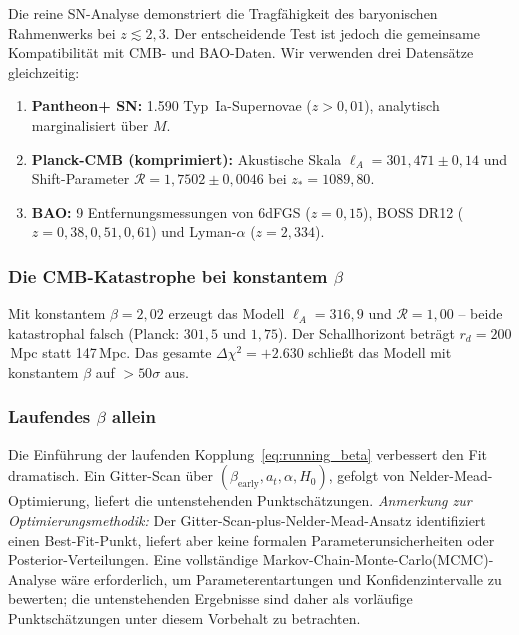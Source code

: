 \documentclass[aps,prd,twocolumn,superscriptaddress,nofootinbib,floatfix]{revtex4-2}
\begin{document}
Die reine SN-Analyse demonstriert die Tragfähigkeit des baryonischen Rahmenwerks bei $z \lesssim 2{,}3$. Der entscheidende Test ist jedoch die gemeinsame Kompatibilität mit CMB- und BAO-Daten. Wir verwenden drei Datensätze gleichzeitig:

\begin{enumerate}
\item \textbf{Pantheon+ SN:} 1.590 Typ~Ia-Supernovae ($z > 0{,}01$), analytisch marginalisiert über $M$.
\item \textbf{Planck-CMB (komprimiert):} Akustische Skala $\ell_A = 301{,}471 \pm 0{,}14$ und Shift-Parameter $\mathcal{R} = 1{,}7502 \pm 0{,}0046$ bei $z_* = 1089{,}80$.
\item \textbf{BAO:} 9 Entfernungsmessungen von 6dFGS ($z = 0{,}15$), BOSS DR12 \cite{Alam2017} ($z = 0{,}38, 0{,}51, 0{,}61$) und Lyman-$\alpha$ ($z = 2{,}334$).
\end{enumerate}

\subsubsection{Die CMB-Katastrophe bei konstantem \texorpdfstring{$\beta$}{beta}}

Mit konstantem $\beta = 2{,}02$ erzeugt das Modell $\ell_A = 316{,}9$ und $\mathcal{R} = 1{,}00$ -- beide katastrophal falsch (Planck: $301{,}5$ und $1{,}75$). Der Schallhorizont beträgt $r_d = 200$\,Mpc statt 147\,Mpc. Das gesamte $\Delta\chi^2 = +2.630$ schließt das Modell mit konstantem $\beta$ auf $>50\sigma$ aus.

\subsubsection{Laufendes \texorpdfstring{$\beta$}{beta} allein}

Die Einführung der laufenden Kopplung~\eqref{eq:running_beta} verbessert den Fit dramatisch. Ein Gitter-Scan über $(\beta_{\mathrm{early}}, a_t, \alpha, H_0)$, gefolgt von Nelder-Mead-Optimierung, liefert die untenstehenden Punktschätzungen. \textit{Anmerkung zur Optimierungsmethodik:} Der Gitter-Scan-plus-Nelder-Mead-Ansatz identifiziert einen Best-Fit-Punkt, liefert aber keine formalen Parameterunsicherheiten oder Posterior-Verteilungen. Eine vollständige Markov-Chain-Monte-Carlo(MCMC)-Analyse wäre erforderlich, um Parameterentartungen und Konfidenzintervalle zu bewerten; die untenstehenden Ergebnisse sind daher als vorläufige Punktschätzungen unter diesem Vorbehalt zu betrachten.
\end{document}
